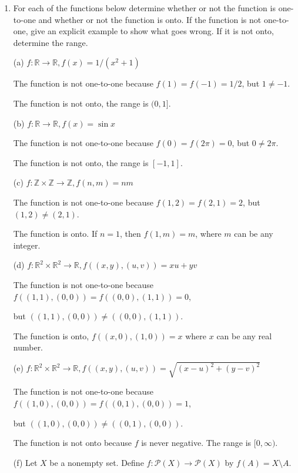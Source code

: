 \documentclass[12pt]{article}
\begin{document}
\begin{enumerate}
\begin{proof}
			Since containment was proved in both directions equality is shown.
		\end{proof}
	
		\item For each of the functions below determine whether or not the function is one-to-one and whether or not the function is onto. If the function is not one-to-one, give an explicit example to show what goes wrong. If it is not onto, determine the range.
		
		(a) $f:\mathbb{R}\to\mathbb{R}, f(x)=1/(x^2+1)$
		
		\qquad The function is not one-to-one because $f(1)=f(-1)=1/2$, but $1\neq -1$.
		
		\qquad The function is not onto, the range is $(0,1]$.
		
		(b) $f:\mathbb{R}\to\mathbb{R}, f(x)=\sin{x}$
		
		\qquad The function is not one-to-one because $f(0)=f(2\pi)=0$, but $0\neq 2\pi$.
		
		\qquad The function is not onto, the range is $[-1,1]$.
		
		(c) $f:\mathbb{Z}\times\mathbb{Z}\to\mathbb{Z}, f(n,m)=nm$
		
		\qquad The function is not one-to-one because $f(1,2)=f(2,1)=2$, but $(1,2)\neq(2,1)$.
		
		\qquad The function is onto. If $n=1$, then $f(1,m)=m$, where $m$ can be any integer.
		
		(d) $f:\mathbb{R}^2\times\mathbb{R}^2\to\mathbb{R}, f((x,y),(u,v))=xu+yv$
		
		\qquad The function is not one-to-one because $f((1,1),(0,0))=f((0,0),(1,1))=0$, 
		
		\qquad but $((1,1),(0,0))\neq((0,0),(1,1))$.
		
		\qquad The function is onto, $f((x,0),(1,0))=x$ where $x$ can be any real number.
		
		(e) $f:\mathbb{R}^2\times\mathbb{R}^2\to\mathbb{R}, f((x,y),(u,v))=\sqrt{(x-u)^2+(y-v)^2}$
		
		\qquad The function is not one-to-one because $f((1,0),(0,0))=f((0,1),(0,0))=1$, 
		
		\qquad but $((1,0),(0,0))\neq((0,1),(0,0))$.
		
		\qquad The function is not onto because $f$ is never negative. The range is $[0,\infty)$.
		
		\newpage
		
		(f) Let $X$ be a nonempty set. Define $f:\mathscr{P}(X)\to\mathscr{P}(X)$ by $f(A)=X\setminus A$. 
		

\end{enumerate}
\end{document}
